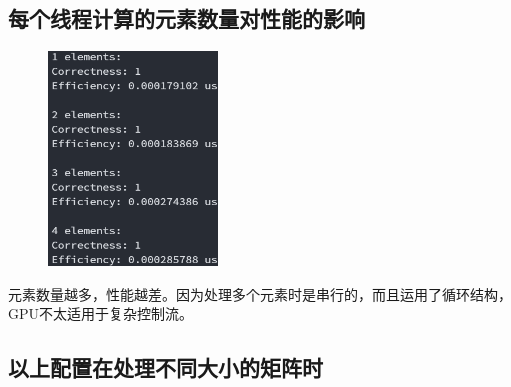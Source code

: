 \documentclass[UTF8, a4paper, 11pt]{article}
\begin{document}
\subsection{每个线程计算的元素数量对性能的影响}
\begin{figure}[H]
    \centering
    \includegraphics[width=0.4\textwidth]{test_c.png}
\end{figure}
元素数量越多，性能越差。因为处理多个元素时是串行的，而且运用了循环结构，GPU不太适用于复杂控制流。
\subsection{以上配置在处理不同大小的矩阵时}
\end{document}
